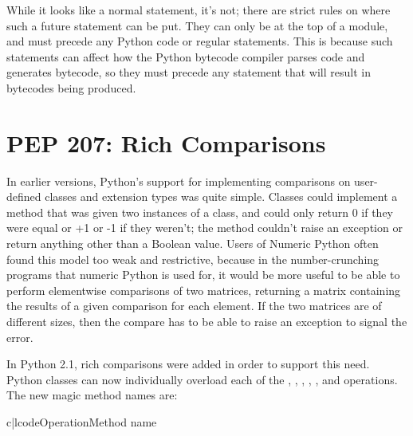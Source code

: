 \documentclass{howto}
\begin{document}
While it looks like a normal  statement, it's not;
there are strict rules on where such a future statement can be put.
They can only be at the top of a module, and must precede any Python
code or regular  statements.  This is because such
statements can affect how the Python bytecode compiler parses code and
generates bytecode, so they must precede any statement that will
result in bytecodes being produced.

\begin{seealso}


\end{seealso}

\section{PEP 207: Rich Comparisons}

In earlier versions, Python's support for implementing comparisons on
user-defined classes and extension types was quite simple. Classes
could implement a  method that was given two instances
of a class, and could only return 0 if they were equal or +1 or -1 if
they weren't; the method couldn't raise an exception or return
anything other than a Boolean value.  Users of Numeric Python often
found this model too weak and restrictive, because in the
number-crunching programs that numeric Python is used for, it would be
more useful to be able to perform elementwise comparisons of two
matrices, returning a matrix containing the results of a given
comparison for each element.  If the two matrices are of different
sizes, then the compare has to be able to raise an exception to signal
the error.

In Python 2.1, rich comparisons were added in order to support this
need.  Python classes can now individually overload each of the
\code{<}, \code{<=}, \code{>}, \code{>=}, \code{==}, and \code{!=}
operations.  The new magic method names are:

\begin{tableii}{c|l}{code}{Operation}{Method name}
   
   
   
  \end{tableii}
\end{document}

